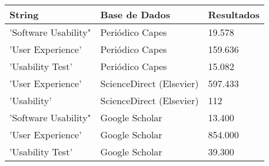 \begin{table}[h]
	\centering
	\begin{tabular}{|l|l|l|}
	\hline
	String               & Base de Dados            & Resultados \\ \hline
	'Software Usability" & Periódico Capes          & 19.578     \\ \hline
	'User Experience'    & Periódico Capes          & 159.636    \\ \hline
	'Usability Test'     & Periódico Capes          & 15.082     \\ \hline
	'User Experience'    & ScienceDirect (Elsevier) & 597.433    \\ \hline
	'Usability'          & ScienceDirect (Elsevier) & 112        \\ \hline
	'Software Usability" & Google Scholar           & 13.400     \\ \hline
	'User Experience'    & Google Scholar           & 854.000    \\ \hline
	'Usability Test'     & Google Scholar           & 39.300     \\ \hline
	\end{tabular}
\end{table}